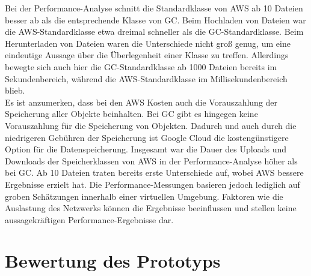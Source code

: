 Bei der Performance-Analyse schnitt die Standardklasse von AWS ab 10 Dateien besser ab als die entsprechende Klasse von GC. Beim Hochladen von Dateien war die AWS-Standardklasse etwa dreimal schneller als die GC-Standardklasse. Beim Herunterladen von Dateien waren die Unterschiede nicht groß genug, um eine eindeutige Aussage über die Überlegenheit einer Klasse zu treffen. Allerdings bewegte sich auch hier die GC-Standardklasse ab 1000 Dateien bereits im Sekundenbereich, während die AWS-Standardklasse im Millisekundenbereich blieb.\\

Es ist anzumerken, dass bei den AWS Kosten auch die Vorauszahlung der Speicherung aller Objekte beinhalten. Bei GC gibt es hingegen keine Vorauszahlung für die Speicherung von Objekten. Dadurch und auch durch die niedrigeren Gebühren der Speicherung ist Google Cloud die kostengünstigere Option für die Datenspeicherung. Insgesamt war die Dauer des Uploads und Downloads der Speicherklassen von AWS in der Performance-Analyse höher als bei GC. Ab 10 Dateien traten bereits erste Unterschiede auf, wobei AWS bessere Ergebnisse erzielt hat. Die Performance-Messungen basieren jedoch lediglich auf groben Schätzungen innerhalb einer virtuellen Umgebung. Faktoren wie die Auslastung des Netzwerks können die Ergebnisse beeinflussen und stellen keine aussagekräftigen Performance-Ergebnisse dar.\\

\section{Bewertung des Prototyps}

